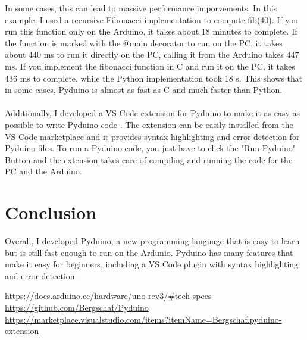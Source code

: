 \documentclass{article}
\begin{document}
\begin{multicols}{2}
In some cases, this can lead to massive performance imporvements. In this example, I used a recursive Fibonacci implementation to compute fib(40). If you run this function only on the Arduino, it takes about 18 minutes to complete. If the function is marked with the @main decorator to run on the PC, it takes about 440 ms to run it directly on the PC, calling it from the Arduino takes 447 ms. If you implement the fibonacci function in C and run it on the PC, it takes 436 ms to complete, while the Python implementation took 18 s. This shows that in some cases, Pyduino is almost as fast as C and much faster than Python. \\
\\
Additionally, I developed a VS Code extension for Pyduino to make it as easy as possible to write Pyduino code \cite{Q3}. The extension can be easily installed from the VS Code marketplace and it provides syntax highlighting and error detection for Pyduino files. To run a Pyduino code, you just have to click the "Run Pyduino" Button and the extension takes care of compiling and running the code for the PC and the Arduino.
\section{Conclusion}
Overall, I developed Pyduino, a new programming language that is easy to learn but is still fast enough to run on the Ardunio. Pyduino has many features that make it easy for beginners, including a VS Code plugin with syntax highlighting and error detection.


\begin{thebibliography}{99}
\url{https://docs.arduino.cc/hardware/uno-rev3/#tech-specs}
\url{https://github.com/Bergschaf/Pyduino}
\url{https://marketplace.visualstudio.com/items?itemName=Bergschaf.pyduino-extension}
\end{thebibliography}
\end{multicols}
\end{document}
